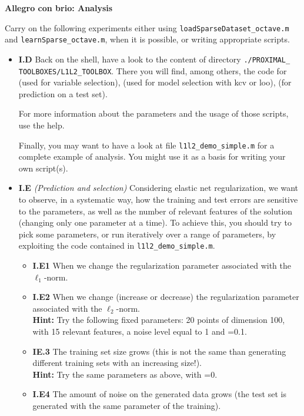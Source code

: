 \documentclass[DIN, pagenumber=false, fontsize=11pt, parskip=half]{scrartcl}
\newcommand{\mysection}[1]{\noindent\large\textbf{#1}}
\begin{document}
\mysection{Allegro con brio: Analysis}

Carry on the following experiments either using \texttt{loadSparseDataset\_octave.m} and \texttt{learnSparse\_octave.m}, when it is possible, or writing appropriate scripts.

\begin{itemize}


	\item \textbf{I.D} 	Back on the shell, have a look to the content of directory \texttt{./PROXIMAL\_} \texttt{TOOLBOXES/L1L2\_TOOLBOX}.
	There you will find, among others, the code for   (used for variable selection),  (used for model selection with kcv or loo),  (for prediction on a test set).

For more information about the parameters and the usage of those scripts, use the help.


Finally, you may want to have a look at file \texttt{l1l2\_demo\_simple.m} for a complete example of analysis.
You might use it as a basis for writing your own script(s).

	\item \textbf{I.E} \emph{(Prediction and selection)}
	Considering elastic net regularization, we want to observe, in a systematic way, how the training and test errors are sensitive to the parameters, as well as the number of relevant features of the solution (changing only one parameter at a time).
	To achieve this, you should try to pick some parameters, or run iteratively over a range of parameters, by exploiting the code contained in \texttt{l1l2\_demo\_simple.m}.

\begin{itemize}
  \item \textbf{I.E1} When we change the  regularization parameter  associated with the $\ell_1$-norm.
  \item \textbf{I.E2} When we change (increase or decrease) the regularization parameter  associated with the $\ell_2$-norm.\\
  \textbf{Hint:} Try the following fixed parameters: 20 points of dimension 100, with 15 relevant features, a noise level equal to 1 and =0.1.
  \item \textbf{IE.3} The training set size grows (this is not the same than generating different training sets with an increasing size!).\\
  \textbf{Hint:} Try the same parameters as above, with =0.
  \item \textbf{I.E4} The amount of noise on the generated data grows (the test set is generated with the same parameter of the training).
\end{itemize}





\end{itemize}
\end{document}
